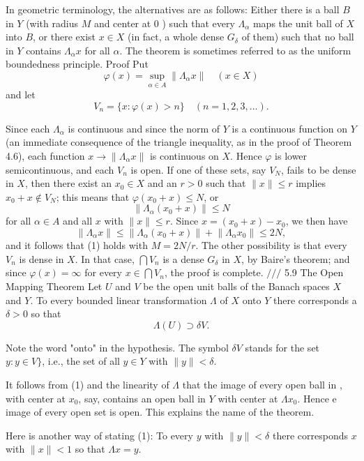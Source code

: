In geometric terminology, the alternatives are as follows: Either there is a ball $B$ in $Y$ (with radius $M$ and center at 0 ) such that every $\Lambda_\alpha$ maps the unit ball of $X$ into $B$, or there exist $x \in X$ (in fact, a whole dense $G_\delta$ of them) such that no ball in $Y$ contains $\Lambda_\alpha x$ for all $\alpha$.
The theorem is sometimes referred to as the uniform boundedness principle.
Proof Put
$$
\varphi(x)=\sup _{\alpha \in A}\left\|\Lambda_\alpha x\right\| \quad(x \in X)
$$
and let
$$
V_n=\{x: \varphi(x)>n\} \quad(n=1,2,3, \ldots) .
$$

Since each $\Lambda_\alpha$ is continuous and since the norm of $Y$ is a continuous function on $Y$ (an immediate consequence of the triangle inequality, as in the proof of Theorem 4.6), each function $x \rightarrow\left\|\Lambda_\alpha x\right\|$ is continuous on $X$. Hence $\varphi$ is lower semicontinuous, and each $V_n$ is open.
If one of these sets, say $V_N$, fails to be dense in $X$, then there exist an $x_0 \in X$ and an $r>0$ such that $\|x\| \leq r$ implies $x_0+x \notin V_N$; this means that $\varphi\left(x_0+x\right) \leq N$, or
$$
\left\|\Lambda_\alpha\left(x_0+x\right)\right\| \leq N
$$
for all $\alpha \in A$ and all $x$ with $\|x\| \leq r$. Since $x=\left(x_0+x\right)-x_0$, we then have
$$
\left\|\Lambda_\alpha x\right\| \leq\left\|\Lambda_\alpha\left(x_0+x\right)\right\|+\left\|\Lambda_\alpha x_0\right\| \leq 2 N,
$$
and it follows that (1) holds with $M=2 N / r$.
The other possibility is that every $V_n$ is dense in $X$. In that case, $\bigcap V_n$ is a dense $G_\delta$ in $X$, by Baire's theorem; and since $\varphi(x)=\infty$ for every $x \in \bigcap V_n$, the proof is complete.
$/ / /$
5.9 The Open Mapping Theorem Let $U$ and $V$ be the open unit balls of the Banach spaces $X$ and $Y$. To every bounded linear transformation $\Lambda$ of $X$ onto $Y$ there corresponds a $\delta>0$ so that
$$
\Lambda(U) \supset \delta V .
$$

Note the word "onto" in the hypothesis. The symbol $\delta V$ stands for the set $y: y \in V\}$, i.e., the set of all $y \in Y$ with $\|y\|<\delta$.

It follows from (1) and the linearity of $\Lambda$ that the image of every open ball in , with center at $x_0$, say, contains an open ball in $Y$ with center at $\Lambda x_0$. Hence e image of every open set is open. This explains the name of the theorem.

Here is another way of stating (1): To every $y$ with $\|y\|<\delta$ there corresponds $x$ with $\|x\|<1$ so that $\Lambda x=y$.

